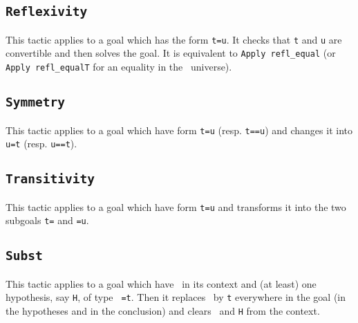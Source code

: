 %  
%

\subsection{\tt Reflexivity}
\label{Reflexivity}
This tactic applies to a goal which has the form {\tt t=u}. It checks
that {\tt t} and {\tt u} are convertible and then solves the goal.
It is equivalent to {\tt Apply refl\_equal} (or {\tt Apply
  refl\_equalT} for an equality in the \Type\ universe).

\begin{ErrMsgs}
\item {}
\item {}
\end{ErrMsgs}

\subsection{\tt Symmetry}
This tactic applies to a goal which have form {\tt t=u}
(resp. \texttt{t==u}) and changes it into {\tt u=t} (resp. \texttt{u==t}).

\subsection{\tt Transitivity \term}
This tactic applies to a goal which have form {\tt t=u}
and transforms it into the two subgoals 
{\tt t={\term}} and {\tt {\term}=u}.

\subsection{\tt Subst {\ident}}
This tactic applies to a goal which have \ident\ in its context and
(at least) one hypothesis, say {\tt H}, of type {\tt
  \ident=t}. Then it replaces 
\ident\ by {\tt t} everywhere in the goal (in the hypotheses 
and in the conclusion) and clears \ident\ and {\tt H} from the context.

